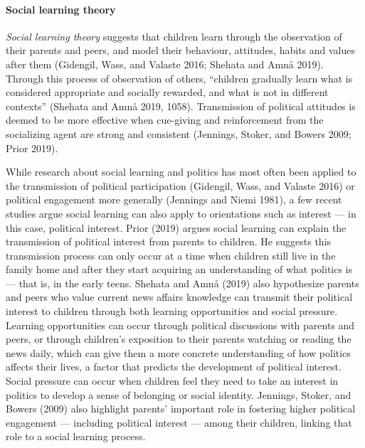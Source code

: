 \documentclass[
  letterpaper,
  DIV=11,
  numbers=noendperiod]{scrreprt}
\let\oldparagraph\paragraph
\renewcommand{\paragraph}[1]{\oldparagraph{#1}\mbox{}}
\begin{document}
\hypertarget{social-learning-theory}{%
\paragraph{Social learning theory}\label{social-learning-theory}}

\emph{Social learning theory} suggests that children learn through the
observation of their parents and peers, and model their behaviour,
attitudes, habits and values after them (Gidengil, Wass, and Valaste
2016; Shehata and Amnå 2019). Through this process of observation of
others, ``children gradually learn what is considered appropriate and
socially rewarded, and what is not in different contexts'' (Shehata and
Amnå 2019, 1058). Transmission of political attitudes is deemed to be
more effective when cue-giving and reinforcement from the socializing
agent are strong and consistent (Jennings, Stoker, and Bowers 2009;
Prior 2019).

While research about social learning and politics has most often been
applied to the transmission of political participation (Gidengil, Wass,
and Valaste 2016) or political engagement more generally (Jennings and
Niemi 1981), a few recent studies argue social learning can also apply
to orientations such as interest --- in this case, political interest.
Prior (2019) argues social learning can explain the transmission of
political interest from parents to children. He suggests this
transmission process can only occur at a time when children still live
in the family home and after they start acquiring an understanding of
what politics is --- that is, in the early teens. Shehata and Amnå
(2019) also hypothesize parents and peers who value current news affairs
knowledge can transmit their political interest to children through both
learning opportunities and social pressure. Learning opportunities can
occur through political discussions with parents and peers, or through
children's exposition to their parents watching or reading the news
daily, which can give them a more concrete understanding of how politics
affects their lives, a factor that predicts the development of political
interest. Social pressure can occur when children feel they need to take
an interest in politics to develop a sense of belonging or social
identity. Jennings, Stoker, and Bowers (2009) also highlight parents'
important role in fostering higher political engagement --- including
political interest --- among their children, linking that role to a
social learning process.
\end{document}
